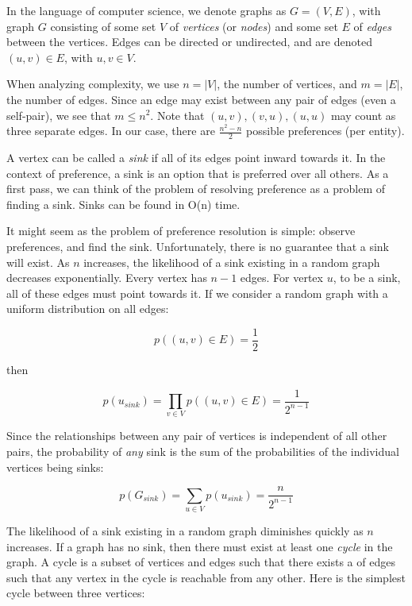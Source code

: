 In the language of computer science, we denote graphs as $G = (V, E)$, with graph $G$ consisting of some set $V$ of \textit{vertices} (or \textit{nodes}) and some set $E$ of \textit{edges} between the vertices.
Edges can be directed or undirected, and are denoted $(u,v) \in E$, with $u, v \in V$.

When analyzing complexity, we use $n = |V|$, the number of vertices, and $m = |E|$, the number of edges.
Since an edge may exist between any pair of edges (even a self-pair), we see that $m \leq n^2$.
Note that $(u,v), (v,u), (u,u)$ may count as three separate edges.
In our case, there are $\frac{n^2-n}{2}$ possible preferences (per entity).

A vertex can be called a \textit{sink} if all of its edges point inward towards it.
In the context of preference, a sink is an option that is preferred over all others.
As a first pass, we can think of the problem of resolving preference as a problem of finding a sink.
Sinks can be found in O(n) time.

It might seem as the problem of preference resolution is simple: observe preferences, and find the sink.
Unfortunately, there is no guarantee that a sink will exist.
As $n$ increases, the likelihood of a sink existing in a random graph decreases exponentially.
Every vertex has $n-1$ edges.
For vertex $u$, to be a sink, all of these edges must point towards it.
If we consider a random graph with a uniform distribution on all edges:

\[
p((u,v) \in E)= \frac{1}{2}
\]

then

\[
p(u_{sink}) = \prod_{v \in V}p((u,v) \in E) = \frac{1}{2^{n-1}}
\]

Since the relationships between any pair of vertices is independent of all other pairs, the probability of \textit{any} sink is the sum of the probabilities of the individual vertices being sinks:

\[
p(G_{sink}) = \sum_{u \in V}p(u_{sink}) = \frac{n}{2^{n-1}}
\]

The likelihood of a sink existing in a random graph diminishes quickly as $n$ increases.
If a graph has no sink, then there must exist at least one \textit{cycle} in the graph.
A cycle is a subset of vertices and edges such that there exists a  of edges such that any vertex in the cycle is reachable from any other.
Here is the simplest cycle between three vertices:

\begin{center}
\end{center}


